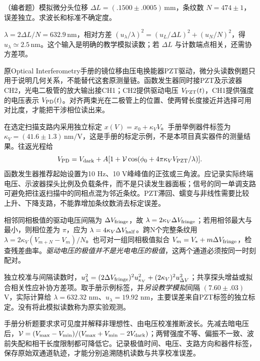 \begin{example}
（编者题）模拟微分头位移 $\Delta L=(.1500\pm.0005)\,\mathrm{mm}$，条纹数 $N=474\pm1$，误差独立。求波长和标准不确定度。
\end{example}
\begin{solution}
$\lambda=2\Delta L/N=632.9\,\mathrm{nm}$，相对方差 $(u_\lambda/\lambda)^2=(u_L/\Delta L)^2+(u_N/N)^2$，得 $u_\lambda\simeq2.5\,\mathrm{nm}$。这个输入是明确的教学模拟读数；若 $\Delta L$ 与计数端点相关，还需协方差项。
\end{solution}

原Optical Interferometry手册的镜位移由压电换能器PZT驱动，微分头读数例题只用于说明几何关系，不能替代这套原测量链。函数发生器同时接PZT及示波器CH2，光电二极管的放大输出接CH1；CH2提供驱动电压 $V_{\rm PZT}(t)$，CH1提供强度的电压表示 $V_{\rm PD}(t)$。对齐两束光在二极管上的位置、使两臂长度接近并选择可用对比度，才能把干涉相位读出来。

在选定扫描支路内采用独立标定 $x(V)=x_0+\kappa_V V$。手册举例器件标签为 $\kappa_V=(41.6\pm1.3)\,\mathrm{nm/V}$，这是手册的标定示例，不是本项目真实器件的测量结果。往返光程给
\[
 V_{\rm PD}=V_{\rm dark}+A[1+\mathcal V\cos(\phi_0+4\pi\kappa_V V_{\rm PZT}/\lambda)].
\]
函数发生器推荐起始设置为10 Hz、10 V峰峰值的正弦或三角波。应记录实际终端电压、示波器探头比例及负载条件，而不是只读发生器面板；信号的同一单调支路可避免把往返扫描中的同相点混为邻近条纹。PZT滞回、蠕变与非线性需要比较上升、下降支路，不能靠增加条纹数消去标定误差。

相邻同相极值的驱动电压间隔为 $\Delta V_{\rm fringe}$，故 $\lambda=2\kappa_V\Delta V_{\rm fringe}$；若用相邻最大与最小，则相位差为 $\pi$，应为 $\lambda=4\kappa_V\Delta V_{\rm half}$。跨N个完整条纹用 $\lambda=2\kappa_V(V_{m+N}-V_m)/N$。也可对一组同相极值拟合 $V_m=V_*+m\Delta V_{\rm fringe}$，检查残差曲率。\emph{驱动电压的极值并不是光电电压的极值}，这两个通道必须按同一时刻配对。

独立校准与间隔读数时，$u_\lambda^2=(2\Delta V_{\rm fringe})^2u_{\kappa_V}^2+(2\kappa_V)^2u_{\Delta V}^2$；共享探头增益或拟合相关性应补协方差项。取手册示例标签，并\emph{另设教学模拟}间隔 $(7.60\pm.03)$ V，实际计算给 $\lambda=632.32$ nm、$u_\lambda=19.92$ nm，主要误差来自PZT标签的独立标定。没有将此模拟读数称为原实验观测。

手册分析题要求求可见度并解释非理想性、由电压校准推断波长。先减去暗电压后，$\mathcal V=(V_{\max}-V_{\min})/(V_{\max}+V_{\min}-2V_{\rm dark})$；两臂强度不等、偏振不一致、波前失配和相干长度限制都可降低它。记录极值时间、电压、支路方向和器件标签，保存原始双通道轨迹，才能分别追溯随机读数与共享校准误差。

